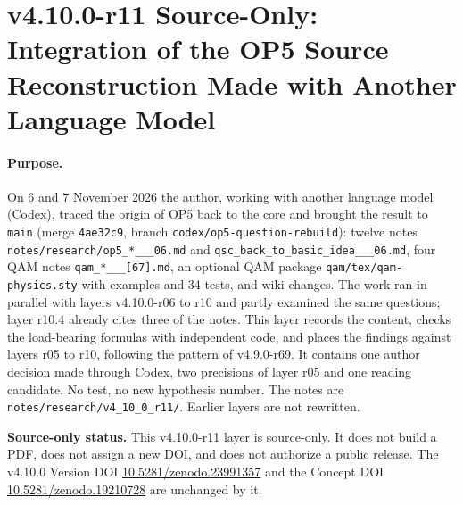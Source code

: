 \clearpage
\section*{v4.10.0-r11 Source-Only: Integration of the OP5 Source Reconstruction Made with Another Language Model}
\label{sec:v4100-r11-op5-reconstruction}

\paragraph{Purpose.}
On 6 and 7 November 2026 the author, working with another language model (Codex), traced the origin of OP5 back to the core and brought the result to
\texttt{main} (merge \texttt{4ae32c9}, branch \texttt{codex/\allowbreak op5-\allowbreak question-\allowbreak rebuild}): twelve notes
\texttt{notes/\allowbreak research/\allowbreak op5\_*\_\_\_\allowbreak 06.md} and
\texttt{qsc\_\allowbreak back\_\allowbreak to\_\allowbreak basic\_\allowbreak idea\_\_\_\allowbreak 06.md}, four QAM notes
\texttt{qam\_*\_\_\_[67].md}, an optional QAM package \texttt{qam/\allowbreak tex/\allowbreak qam-physics.sty} with examples
and 34 tests, and wiki changes.  The work ran in parallel with layers v4.10.0-r06 to r10 and partly examined the same questions; layer r10.4 already cites three
of the notes.  This layer records the content, checks the load-bearing formulas with independent code, and places the findings against layers r05 to
r10, following the pattern of v4.9.0-r69.  It contains one author decision made through Codex, two precisions of layer r05 and one reading candidate.  No
test, no new hypothesis number.  The notes are \texttt{notes/\allowbreak research/\allowbreak v4\_10\_0\_r11/}.  Earlier layers are not rewritten.

\noindent\textbf{Source-only status.}
This v4.10.0-r11 layer is source-only.  It does not build a PDF, does not assign a new DOI,
and does not authorize a public release.  The v4.10.0 Version DOI
\href{https://doi.org/10.5281/zenodo.23991357}{10.5281/zenodo.23991357} and the Concept DOI
\href{https://doi.org/10.5281/zenodo.19210728}{10.5281/zenodo.19210728} are unchanged by it.

